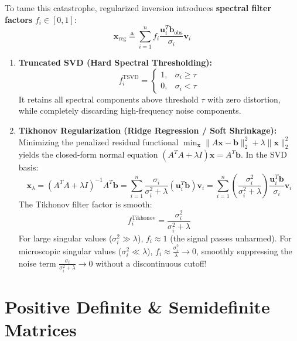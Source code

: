 To tame this catastrophe, regularized inversion introduces \textbf{spectral filter factors} $f_i \in [0, 1]$:
\begin{equation}
\mathbf{x}_{\text{reg}} \triangleq \sum_{i=1}^n f_i \frac{\mathbf{u}_i^T \mathbf{b}_{\text{obs}}}{\sigma_i} \mathbf{v}_i
\end{equation}
\begin{enumerate}
    \item \textbf{Truncated SVD (Hard Spectral Thresholding):}
    \begin{equation}
    f_i^{\text{TSVD}} = \begin{cases} 1, & \sigma_i \ge \tau \\ 0, & \sigma_i < \tau \end{cases}
    \end{equation}
    It retains all spectral components above threshold $\tau$ with zero distortion, while completely discarding high-frequency noise components.
    \item \textbf{Tikhonov Regularization (Ridge Regression / Soft Shrinkage):}
    Minimizing the penalized residual functional $\min_{\mathbf{x}} \|A\mathbf{x} - \mathbf{b}\|_2^2 + \lambda \|\mathbf{x}\|_2^2$ yields the closed-form normal equation $(A^T A + \lambda I)\mathbf{x} = A^T \mathbf{b}$. In the SVD basis:
    \begin{equation}
    \mathbf{x}_{\lambda} = (A^T A + \lambda I)^{-1} A^T \mathbf{b} = \sum_{i=1}^n \frac{\sigma_i}{\sigma_i^2 + \lambda} (\mathbf{u}_i^T \mathbf{b}) \mathbf{v}_i = \sum_{i=1}^n \left( \frac{\sigma_i^2}{\sigma_i^2 + \lambda} \right) \frac{\mathbf{u}_i^T \mathbf{b}}{\sigma_i} \mathbf{v}_i
    \end{equation}
    The Tikhonov filter factor is smooth:
    \begin{equation}
    f_i^{\text{Tikhonov}} = \frac{\sigma_i^2}{\sigma_i^2 + \lambda}
    \end{equation}
    For large singular values ($\sigma_i^2 \gg \lambda$), $f_i \approx 1$ (the signal passes unharmed). For microscopic singular values ($\sigma_i^2 \ll \lambda$), $f_i \approx \frac{\sigma_i^2}{\lambda} \to 0$, smoothly suppressing the noise term $\frac{\sigma_i}{\sigma_i^2 + \lambda} \to 0$ without a discontinuous cutoff!
\end{enumerate}

\section{Positive Definite \& Semidefinite Matrices}

